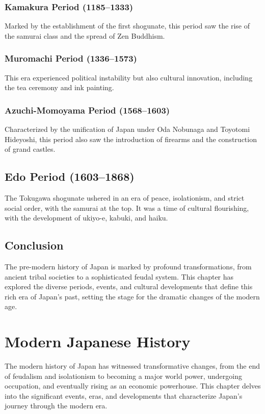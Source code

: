 \documentclass[a4paper,12pt]{book}
\begin{document}
\subsection{Kamakura Period (1185–1333)}
\label{subsec:kamakura-period}
Marked by the establishment of the first shogunate, this period saw the rise of the samurai class and the spread of Zen Buddhism.

\subsection{Muromachi Period (1336–1573)}
\label{subsec:muromachi-period}
This era experienced political instability but also cultural innovation, including the tea ceremony and ink painting.

\subsection{Azuchi-Momoyama Period (1568–1603)}
\label{subsec:azuchi-momoyama-period}
Characterized by the unification of Japan under Oda Nobunaga and Toyotomi Hideyoshi, this period also saw the introduction of firearms and the construction of grand castles.

\section{Edo Period (1603–1868)}
\label{sec:edo-period}
The Tokugawa shogunate ushered in an era of peace, isolationism, and strict social order, with the samurai at the top. It was a time of cultural flourishing, with the development of ukiyo-e, kabuki, and haiku.

\section{Conclusion}
\label{sec:conclusion-pre-modern-japan}
The pre-modern history of Japan is marked by profound transformations, from ancient tribal societies to a sophisticated feudal system. This chapter has explored the diverse periods, events, and cultural developments that define this rich era of Japan’s past, setting the stage for the dramatic changes of the modern age.

\chapter{Modern Japanese History}
\label{ch:modern-japanese-history}

The modern history of Japan has witnessed transformative changes, from the end of feudalism and isolationism to becoming a major world power, undergoing occupation, and eventually rising as an economic powerhouse. This chapter delves into the significant events, eras, and developments that characterize Japan’s journey through the modern era.
\end{document}
